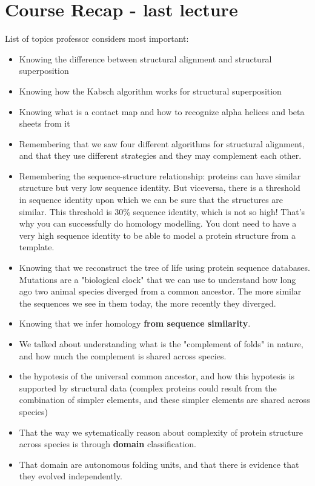 \documentclass[11pt,a4paper]{article}
\begin{document}
\section*{Course Recap - last lecture}
List of topics professor considers most important:
\vspace*{0.5em}
\begin{itemize}
    \item Knowing the difference between structural alignment and structural superposition
    \item Knowing how the Kabsch algorithm works for structural superposition
    \item Knowing what is a contact map and how to recognize alpha helices and beta sheets from it
    \item Remembering that we saw four different algorithms for structural alignment, and that they use different strategies and they may complement each other.
    \item Remembering the sequence-structure relationship: proteins can have similar structure but very low sequence identity. But viceversa, there is a threshold in sequence identity upon which
    we can be sure that the structures are similar. This threshold is 30\% sequence identity, which is not so high! That's why you can successfully do homology modelling. You dont need to have a very high sequence identity to be able to model a protein structure from a template.
    \item Knowing that we reconstruct the tree of life using protein sequence databases. Mutations are a "biological clock" that we can use to understand how long ago two animal species diverged from a common ancestor. The more similar the sequences we see in them today, the more recently they diverged. 
    \item Knowing that we infer homology \textbf{from sequence similarity}.
    \item We talked about understanding what is the "complement of folds" in nature, and how much the complement is shared across species. 
    \item the hypotesis of the universal common ancestor, and how this hypotesis is supported by structural data (complex proteins could result from the combination of simpler elements, and these simpler elements are shared across species)
    \item That the way we sytematically reason about complexity of protein structure across species is through \textbf{domain} classification.
    \item That domain are autonomous folding units, and that there is evidence that they evolved independently.

\end{itemize}
\end{document}
